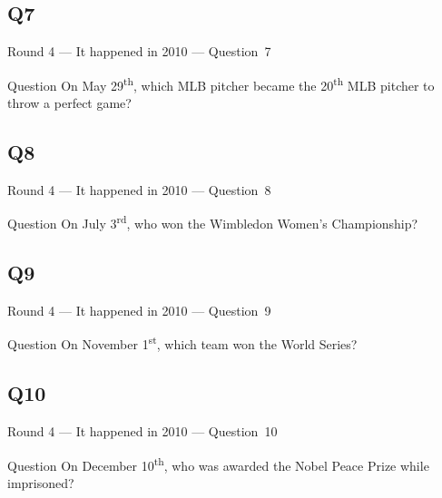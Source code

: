 \documentclass[11pt,draft]{beamer}
\begin{document}
\subsection*{Q7}
\begin{frame}[t]{Round 4 --- It happened in 2010 --- \mbox{Question 7}}
    \begin{block}{Question}
        On May 29\textsuperscript{th}, which MLB pitcher became the 20\textsuperscript{th} MLB pitcher to throw a perfect game?
    \end{block}
\end{frame}
\subsection*{Q8}
\begin{frame}[t]{Round 4 --- It happened in 2010 --- \mbox{Question 8}}
    \begin{block}{Question}
        On July 3\textsuperscript{rd}, who won the Wimbledon Women's Championship?
    \end{block}
\end{frame}
\subsection*{Q9}
\begin{frame}[t]{Round 4 --- It happened in 2010 --- \mbox{Question 9}}
    \begin{block}{Question}
        On November 1\textsuperscript{st}, which team won the World Series?
    \end{block}
\end{frame}
\subsection*{Q10}
\begin{frame}[t]{Round 4 --- It happened in 2010 --- \mbox{Question 10}}
    \begin{block}{Question}
        On December 10\textsuperscript{th}, who was awarded the Nobel Peace Prize while imprisoned?
    \end{block}
\end{frame}
\end{document}
